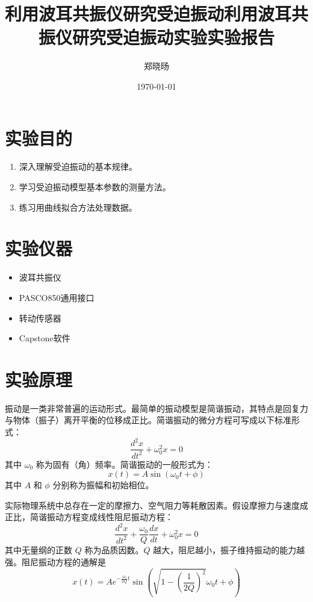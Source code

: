 \documentclass[UTF8]{ctexart}
\title{利用波耳共振仪研究受迫振动}
\title{利用波耳共振仪研究受迫振动实验实验报告}
\author{郑晓旸}
\date{\today}
\begin{document}
\fancyfoot[C]{\thepage}

\maketitle
\tableofcontents
\newpage

\section{实验目的}
\begin{enumerate}
    \item 深入理解受迫振动的基本规律。
    \item 学习受迫振动模型基本参数的测量方法。
    \item 练习用曲线拟合方法处理数据。
\end{enumerate}

\section{实验仪器}
\begin{itemize}
    \item 波耳共振仪
    \item PASCO850通用接口
    \item 转动传感器
    \item Capstone软件
\end{itemize}

\section{实验原理}
振动是一类非常普遍的运动形式。最简单的振动模型是简谐振动，其特点是回复力与物体（振子）离开平衡的位移成正比。简谐振动的微分方程可写成以下标准形式：
\begin{equation}
\frac{d^2 x}{d t^2} + \omega_0^2 x = 0
\end{equation}
其中 $\omega_0$ 称为固有（角）频率。简谐振动的一般形式为：
\begin{equation}
x(t) = A \sin(\omega_0 t + \phi)
\end{equation}
其中 $A$ 和 $\phi$ 分别称为振幅和初始相位。

实际物理系统中总存在一定的摩擦力、空气阻力等耗散因素。假设摩擦力与速度成正比，简谐振动方程变成线性阻尼振动方程：
\begin{equation}
\frac{d^2 x}{d t^2} + \frac{\omega_0}{Q} \frac{d x}{d t} + \omega_0^2 x = 0
\end{equation}
其中无量纲的正数 $Q$ 称为品质因数。$Q$ 越大，阻尼越小，振子维持振动的能力越强。阻尼振动方程的通解是
\begin{equation}
x(t) = A e^{-\frac{\omega_0}{2Q} t} \sin\left(\sqrt{1 - \left(\frac{1}{2Q}\right)^2} \omega_0 t + \phi\right)
\end{equation}
\end{document}
